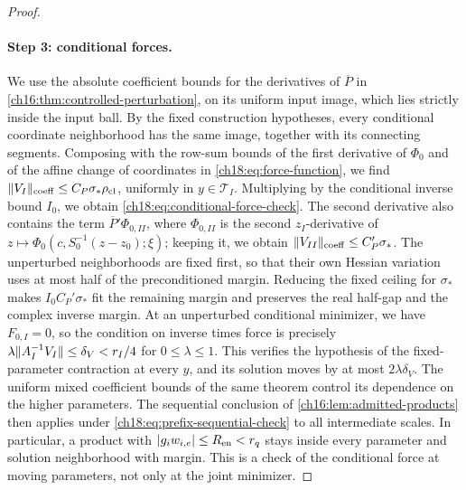 \begin{proof}
\paragraph{Step 3: conditional forces.}
We use the absolute coefficient bounds for the derivatives of $\overline P$ in \cref{ch16:thm:controlled-perturbation}, on its uniform input image, which lies strictly inside the input ball. By the fixed construction hypotheses, every conditional coordinate neighborhood has the same image, together with its connecting segments. Composing with the row-sum bounds of the first derivative of $\Phi_0$ and of the affine change of coordinates in \eqref{ch18:eq:force-function}, we find $\lVert V_I\rVert_{\mathrm{coeff}}\le C_P\sigma_*\rho_{\mathrm{cl}}$, uniformly in $y\in\mathcal T_I$. Multiplying by the conditional inverse bound $I_0$, we obtain \eqref{ch18:eq:conditional-force-check}. The second derivative also contains the term $\overline P'\Phi_{0,II}$, where $\Phi_{0,II}$ is the second $z_I$-derivative of $z\mapsto\Phi_0(c,S_0^{-1}(z-z_0);\xi)$; keeping it, we obtain $\lVert V_{II}\rVert_{\mathrm{coeff}}\le C_P'\sigma_*$. The unperturbed neighborhoods are fixed first, so that their own Hessian variation uses at most half of the preconditioned margin. Reducing the fixed ceiling for $\sigma_*$ makes $I_0C_P'\sigma_*$ fit the remaining margin and preserves the real half-gap and the complex inverse margin. At an unperturbed conditional minimizer, we have $F_{0,I}=0$, so the condition on inverse times force is precisely $\lambda\lVert A_I^{-1}V_I\rVert\le\delta_V<r_I/4$ for $0\le\lambda\le1$. This verifies the hypothesis of the fixed-parameter contraction at every $y$, and its solution moves by at most $2\lambda\delta_V$. The uniform mixed coefficient bounds of the same theorem control its dependence on the higher parameters. The sequential conclusion of \cref{ch16:lem:admitted-products} then applies under \eqref{ch18:eq:prefix-sequential-check} to all intermediate scales. In particular, a product with $\lvert g_iw_{i,e}\rvert\le R_{\mathrm{en}}<r_q$ stays inside every parameter and solution neighborhood with margin. This is a check of the conditional force at moving parameters, not only at the joint minimizer.


\end{proof}

